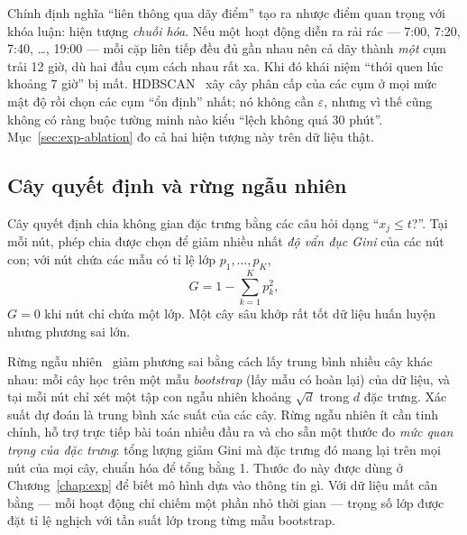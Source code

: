 Chính định nghĩa ``liên thông qua dãy điểm'' tạo ra nhược điểm quan trọng với khóa luận: hiện tượng
\emph{chuỗi hóa}. Nếu một hoạt động diễn ra rải rác --- 7:00, 7:20, 7:40, \dots, 19:00 --- mỗi cặp liên
tiếp đều đủ gần nhau nên cả dãy thành \emph{một} cụm trải 12 giờ, dù hai đầu cụm cách nhau rất xa. Khi
đó khái niệm ``thói quen lúc khoảng 7 giờ'' bị mất. HDBSCAN~\cite{campello2013hdbscan} xây cây phân cấp
của các cụm ở mọi mức mật độ rồi chọn các cụm ``ổn định'' nhất; nó không cần $\varepsilon$, nhưng vì thế
cũng không có ràng buộc tường minh nào kiểu ``lệch không quá 30 phút''. Mục~\ref{sec:exp-ablation} đo cả
hai hiện tượng này trên dữ liệu thật.

\subsection{Cây quyết định và rừng ngẫu nhiên}
\label{sec:bg-rf}
Cây quyết định chia không gian đặc trưng bằng các câu hỏi dạng ``$x_j \le t$?''. Tại mỗi nút, phép chia
được chọn để giảm nhiều nhất \emph{độ vẩn đục Gini} của các nút con; với nút chứa các mẫu có tỉ lệ lớp
$p_1, \dots, p_K$,
\begin{equation}
  G = 1 - \sum_{k=1}^{K} p_k^2 ,
\end{equation}
$G = 0$ khi nút chỉ chứa một lớp. Một cây sâu khớp rất tốt dữ liệu huấn luyện nhưng phương sai lớn.

Rừng ngẫu nhiên~\cite{breiman2001rf} giảm phương sai bằng cách lấy trung bình nhiều cây khác nhau: mỗi cây
học trên một mẫu \emph{bootstrap} (lấy mẫu có hoàn lại) của dữ liệu, và tại mỗi nút chỉ xét một tập con
ngẫu nhiên khoảng $\sqrt{d}$ trong $d$ đặc trưng. Xác suất dự đoán là trung bình xác suất của các cây.
Rừng ngẫu nhiên ít cần tinh chỉnh, hỗ trợ trực tiếp bài toán nhiều đầu ra và cho sẵn một thước đo
\emph{mức quan trọng của đặc trưng}: tổng lượng giảm Gini mà đặc trưng đó mang lại trên mọi nút của mọi cây,
chuẩn hóa để tổng bằng 1. Thước đo này được dùng ở Chương~\ref{chap:exp} để biết mô hình dựa vào thông tin
gì. Với dữ liệu mất cân bằng --- mỗi hoạt động chỉ chiếm một phần nhỏ thời gian --- trọng số lớp được đặt
tỉ lệ nghịch với tần suất lớp trong từng mẫu bootstrap.

